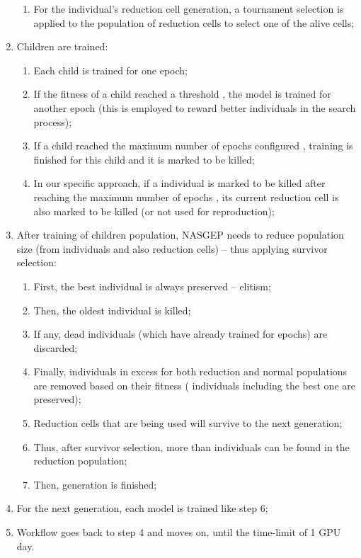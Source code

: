 \documentclass[conference]{IEEEtran}
\begin{document}
\begin{enumerate}
\begin{enumerate}
			\item For the individual's reduction cell generation, a tournament selection is applied to the population of reduction cells to select one of the alive cells;
		\end{enumerate} 		
		\item Children are trained:
		\begin{enumerate}
			\item Each child is trained for one epoch;
			\item If the fitness of a child reached a threshold , the model is trained for another epoch (this is employed to reward better individuals in the search process);
			\item If a child reached the maximum number of epochs configured , training is finished for this child and it is marked to be killed;
			\item In our specific approach, if a individual is marked to be killed after reaching the maximum number of epochs , its current reduction cell is also marked to be killed (or not used for reproduction);
		\end{enumerate}
		\item After training of children population, NASGEP needs to reduce population size (from individuals and also reduction cells) -- thus applying survivor selection:
		\begin{enumerate}
			\item First, the best individual is always preserved -- elitism;
			\item Then, the oldest individual is killed;
			\item If any, dead individuals (which have already trained for  epochs) are discarded;
			\item Finally, individuals in excess for both reduction and normal populations are removed based on their fitness ( individuals including the best one are preserved);
			\item Reduction cells that are being used will survive to the next generation;	
			\item Thus, after survivor selection, more than  individuals can be found in the reduction population;
			\item Then, generation is finished;
		\end{enumerate}
		\item For the next generation, each model is trained like step 6;
		\item Workflow goes back to step 4 and moves on, until the time-limit of 1 GPU day.
		
	\end{enumerate}
	
\end{document}
